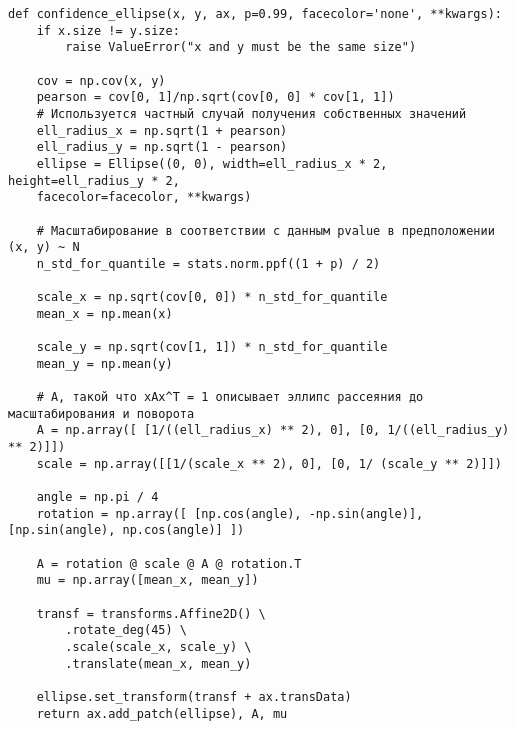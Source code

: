 {
	\vspace{-1.5em}
	\label{conf_ellipse}
	\begin{verbatim}
def confidence_ellipse(x, y, ax, p=0.99, facecolor='none', **kwargs):
	if x.size != y.size:
		raise ValueError("x and y must be the same size")
	
	cov = np.cov(x, y)
	pearson = cov[0, 1]/np.sqrt(cov[0, 0] * cov[1, 1])
	# Используется частный случай получения собственных значений
	ell_radius_x = np.sqrt(1 + pearson)
	ell_radius_y = np.sqrt(1 - pearson)
	ellipse = Ellipse((0, 0), width=ell_radius_x * 2, height=ell_radius_y * 2,
	facecolor=facecolor, **kwargs)
	
	# Масштабирование в соответствии с данным pvalue в предположении (x, y) ~ N 
	n_std_for_quantile = stats.norm.ppf((1 + p) / 2)
	
	scale_x = np.sqrt(cov[0, 0]) * n_std_for_quantile
	mean_x = np.mean(x)
	
	scale_y = np.sqrt(cov[1, 1]) * n_std_for_quantile
	mean_y = np.mean(y)
	
	# A, такой что xAx^T = 1 описывает эллипс рассеяния до масштабирования и поворота
	A = np.array([ [1/((ell_radius_x) ** 2), 0], [0, 1/((ell_radius_y) ** 2)]])
	scale = np.array([[1/(scale_x ** 2), 0], [0, 1/ (scale_y ** 2)]])
	
	angle = np.pi / 4
	rotation = np.array([ [np.cos(angle), -np.sin(angle)], [np.sin(angle), np.cos(angle)] ])
	
	A = rotation @ scale @ A @ rotation.T
	mu = np.array([mean_x, mean_y])
	
	transf = transforms.Affine2D() \
		.rotate_deg(45) \
		.scale(scale_x, scale_y) \
		.translate(mean_x, mean_y)
	
	ellipse.set_transform(transf + ax.transData)
	return ax.add_patch(ellipse), A, mu
	\end{verbatim}
}


